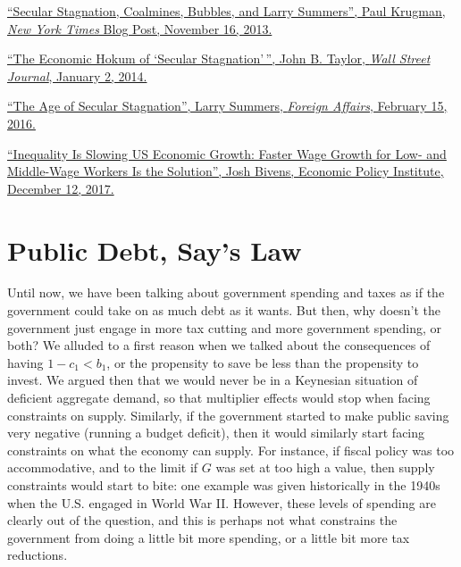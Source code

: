 \documentclass[]{book}
\theoremstyle{definition}
\theoremstyle{definition}
\theoremstyle{definition}
\theoremstyle{remark}
\begin{document}
\href{https://krugman.blogs.nytimes.com/2013/11/16/secular-stagnation-coalmines-bubbles-and-larry-summers/}{``Secular
Stagnation, Coalmines, Bubbles, and Larry Summers'', Paul Krugman,
\emph{New York Times} Blog Post, November 16, 2013.}

\href{https://search.proquest.com/docview/1473347330/6C9B371C00BE4C7BPQ/1?accountid=14512}{``The
Economic Hokum of `Secular Stagnation'\,'', John B. Taylor, \emph{Wall
Street Journal}, January 2, 2014.}

\href{http://larrysummers.com/2016/02/17/the-age-of-secular-stagnation/}{``The
Age of Secular Stagnation'', Larry Summers, \emph{Foreign Affairs},
February 15, 2016.}

\href{https://www.epi.org/publication/secular-stagnation/}{``Inequality
Is Slowing US Economic Growth: Faster Wage Growth for Low- and
Middle-Wage Workers Is the Solution'', Josh Bivens, Economic Policy
Institute, December 12, 2017.}

\hypertarget{public-debt}{\chapter{Public Debt, Say's
Law}\label{public-debt}}

Until now, we have been talking about government spending and taxes as
if the government could take on as much debt as it wants. But then, why
doesn't the government just engage in more tax cutting and more
government spending, or both? We alluded to a first reason when we
talked about the consequences of having \(1-c_1<b_1\), or the propensity
to save be less than the propensity to invest. We argued then that we
would never be in a Keynesian situation of deficient aggregate demand,
so that multiplier effects would stop when facing constraints on supply.
Similarly, if the government started to make public saving very negative
(running a budget deficit), then it would similarly start facing
constraints on what the economy can supply. For instance, if fiscal
policy was too accommodative, and to the limit if \(G\) was set at too
high a value, then supply constraints would start to bite: one example
was given historically in the 1940s when the U.S. engaged in World War
II. However, these levels of spending are clearly out of the question,
and this is perhaps not what constrains the government from doing a
little bit more spending, or a little bit more tax reductions.
\end{document}
